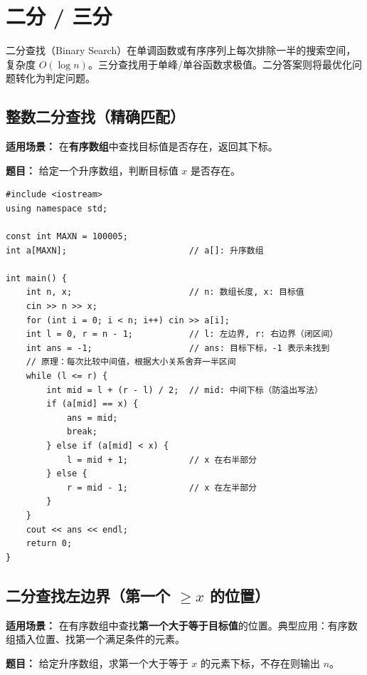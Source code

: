 \documentclass[12pt,a4paper]{ctexart}
\begin{document}
\newpage

\section{二分 / 三分}
二分查找（Binary Search）在单调函数或有序序列上每次排除一半的搜索空间，复杂度 $O(\log n)$。三分查找用于单峰/单谷函数求极值。二分答案则将最优化问题转化为判定问题。

\subsection{整数二分查找（精确匹配）}
\textbf{适用场景：} 在\textbf{有序数组}中查找目标值是否存在，返回其下标。

\textbf{题目：} 给定一个升序数组，判断目标值 $x$ 是否存在。

\begin{lstlisting}[caption={整数二分——查找目标值}]
#include <iostream>
using namespace std;

const int MAXN = 100005;
int a[MAXN];                        // a[]: 升序数组

int main() {
    int n, x;                       // n: 数组长度, x: 目标值
    cin >> n >> x;
    for (int i = 0; i < n; i++) cin >> a[i];
    int l = 0, r = n - 1;           // l: 左边界, r: 右边界（闭区间）
    int ans = -1;                   // ans: 目标下标，-1 表示未找到
    // 原理：每次比较中间值，根据大小关系舍弃一半区间
    while (l <= r) {
        int mid = l + (r - l) / 2;  // mid: 中间下标（防溢出写法）
        if (a[mid] == x) {
            ans = mid;
            break;
        } else if (a[mid] < x) {
            l = mid + 1;            // x 在右半部分
        } else {
            r = mid - 1;            // x 在左半部分
        }
    }
    cout << ans << endl;
    return 0;
}
\end{lstlisting}

\subsection{二分查找左边界（第一个 $\ge x$ 的位置）}
\textbf{适用场景：} 在有序数组中查找\textbf{第一个大于等于目标值}的位置。典型应用：有序数组插入位置、找第一个满足条件的元素。

\textbf{题目：} 给定升序数组，求第一个大于等于 $x$ 的元素下标，不存在则输出 $n$。
\end{document}
